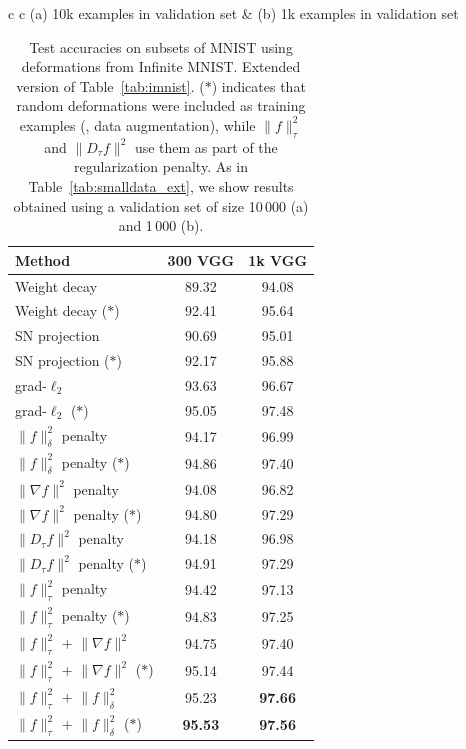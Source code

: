 \begin{table}
\caption{Test accuracies on subsets of MNIST using deformations from Infinite MNIST.
Extended version of Table~\ref{tab:imnist}.
($\ast$) indicates that random deformations were included as training examples (\ie, data augmentation),
while $\|f\|_\tau^2$ and $\|D_\tau f\|^2$
use them as part of the regularization penalty.
As in Table~\ref{tab:smalldata_ext}, we show results obtained using a validation set
of size 10\,000 (a) and 1\,000 (b).
}
\centering
\vspace{0.2cm}
\label{tab:imnist_ext}
\begin{tabular}{c c}
(a) 10k examples in validation set
& (b) 1k examples in validation set \\

\begin{tabular}{ | l | c | c |  }
\hline
Method & 300 VGG & 1k VGG \\ \hline
\hline
Weight decay & 89.32 & 94.08 \\
Weight decay ($\ast$) & 92.41 & 95.64 \\
SN projection & 90.69 & 95.01 \\
SN projection ($\ast$) & 92.17 & 95.88 \\
grad-$\ell_2$ & 93.63 & 96.67 \\
grad-$\ell_2$ ($\ast$) & 95.05 & 97.48 \\
\hline
$\|f\|_\delta^2$ penalty & 94.17 & 96.99 \\
$\|f\|_\delta^2$ penalty ($\ast$) & 94.86 & 97.40 \\
$\|\nabla f\|^2$ penalty & 94.08 & 96.82 \\
$\|\nabla f\|^2$ penalty ($\ast$) & 94.80 & 97.29 \\
$\|D_\tau f\|^2$ penalty & 94.18 & 96.98 \\
$\|D_\tau f\|^2$ penalty ($\ast$) & 94.91 & 97.29 \\
$\|f\|_\tau^2$ penalty & 94.42 & 97.13 \\
$\|f\|_\tau^2$ penalty ($\ast$) & 94.83 & 97.25 \\
$\|f\|_{\tau}^2$ + $\|\nabla f\|^2$ & 94.75 & 97.40 \\
$\|f\|_{\tau}^2$ + $\|\nabla f\|^2$ ($\ast$) & 95.14 & 97.44 \\
$\|f\|_{\tau}^2$ + $\|f\|^2_\delta$ & 95.23 & \textbf{\color{darkgray}97.66} \\
$\|f\|_{\tau}^2$ + $\|f\|^2_\delta$ ($\ast$) & \textbf{95.53} & \textbf{\color{darkgray}97.56} \\

\end{tabular}
\end{tabular}
\end{table}
